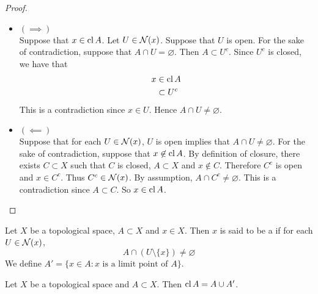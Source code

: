 \documentclass{book}
\begin{document}
	\begin{proof} \
		\begin{itemize}
			\item $(\implies)$ \\
			Suppose that $x \in \operatorname{cl} A$. Let $U \in \mathcal{N}(x)$. Suppose that $U$ is open. For the sake of contradiction, suppose that $A \cap U = \varnothing$. Then $A \subset U^c$. Since $U^c$ is closed, we have that 
			\begin{align*}
				x 
				& \in \operatorname{cl} A \\
				& \subset U^c
			\end{align*}
			This is a contradiction since $x \in U$. Hence $A \cap U \neq \varnothing$. 
			\item $(\impliedby)$ \\ 
			Suppose that for each $U \in \mathcal{N}(x)$, $U$ is open implies that $A \cap U \neq \varnothing$. For the sake of contradiction, suppose that $x \not \in \operatorname{cl} A$. By definition of closure, there exists $C \subset X$ such that $C$ is closed, $A \subset X$ and $x \not \in C$. Therefore $C^c$ is open and $x \in C^c$. Thus $C^c \in \mathcal{N}(x)$. By assumption, $A \cap C^c \neq \varnothing$. This is a contradiction since $A \subset C$. So $x \in \operatorname{cl} A$.
			
		\end{itemize}
	\end{proof}
	
	\begin{defn} 
	Let $X$ be a topological space, $A \subset X$ and $x \in X$. Then $x$ is said to be a  if for each $U \in \mathcal{N}(x)$, $$A \cap (U \setminus \{x\}) \neq \varnothing$$  
	We define $A' = \{x \in A: \text{$x$ is a limit point of $A$}\}$.
	\end{defn}
	
	\begin{ex} 
	Let $X$ be a topological space and $A \subset X$. Then $\operatorname{cl} A = A \cup A'$. 
	\end{ex}	
	
\end{document}
